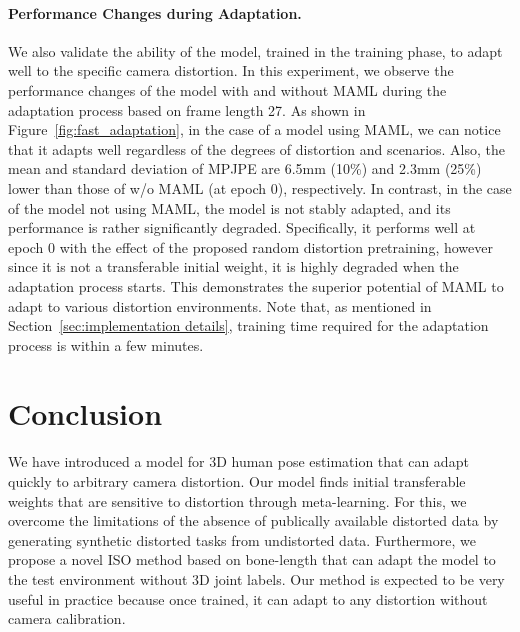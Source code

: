         \paragraph{Performance Changes during Adaptation.}
            We also validate the ability of the model, trained in the training phase, to adapt well to the specific camera distortion. In this experiment, we observe the performance changes of the model with and without MAML during the adaptation process based on frame length 27. As shown in Figure~\ref{fig:fast_adaptation}, in the case of a model using MAML, we can notice that it adapts well regardless of the degrees of distortion and scenarios. Also, the mean and standard deviation of MPJPE are 6.5mm (10\%) and 2.3mm (25\%) lower than those of w/o MAML (at epoch 0), respectively. In contrast, in the case of the model not using MAML, the model is not stably adapted, and its performance is rather significantly degraded. Specifically, it performs well at epoch $0$ with the effect of the proposed random distortion pretraining, however since it is not a transferable initial weight, it is highly degraded when the adaptation process starts. This demonstrates the superior potential of MAML to adapt to various distortion environments. Note that, as mentioned in Section~\ref{sec:implementation details}, training time required for the adaptation process is within a few minutes.
\vspace{-6mm}


\section{Conclusion}
    \vspace{-2mm}
    We have introduced a model for 3D human pose estimation that can adapt quickly to arbitrary camera distortion. Our model finds initial transferable weights that are sensitive to distortion through meta-learning. For this, we overcome the limitations of the absence of publically available distorted data by generating synthetic distorted tasks from undistorted data. Furthermore, we propose a novel ISO method based on bone-length that can adapt the model to the test environment without 3D joint labels. Our method is expected to be very useful in practice because once trained, it can adapt to any distortion without camera calibration.